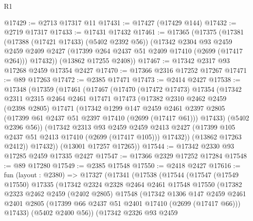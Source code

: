 \begin{lexlean}{R1}
\begin{coremodule}
@17429 := @2713 @17317 @11
@17431 := @17427 (@17429 @144)
@17432 := @2719 @17317
@17433 := @17431 @17432
@17461 := @17365
    (@17375
      (@17381
        (@17388 (@17421 @17433) (@5402 @2392 @56))
        (@17342
          @2304
          @93
          @2459
          @2459
          @2409
          @2427
          (@17399 @264 @2437 @51 @2409 @17410 (@2699 (@17417 @264)))
          @17432))
      (@13862 @17255 @2408))
@17467 := @17342 @2317 @93 @17268 @2459 @17354 @2427
@17470 := @17366 @2316 @17252 @17267
@17471 := @89 @17263
@17472 := @2385 @17471
@17473 := @2414 @2427
@17538 := @17348
    (@17359
      (@17461
        (@17467
          (@17470
            (@17472 @17473)
            @17354
            (@17342
              @2311
              @2315
              @2464
              @2461
              @17471
              @17473
              (@17382
                @2310
                @2462
                @2459
                (@2398 @2805)
                @17471
                (@17342
                  @1299
                  @147
                  @2459
                  @2461
                  @2397
                  @2805
                  (@17399 @61 @2437 @51 @2397 @17410 (@2699 (@17417 @61)))
                  @17433)
                (@5402 @2396 @56))
              (@17342
                @2313
                @93
                @2459
                @2459
                @2413
                @2427
                (@17399 @105 @2437 @51 @2413 @17410 (@2699 (@17417 @105)))
                @17432))
            (@13862 @17263 @2412))
          @17432))
      (@13001 @17257 @17265))
@17544 := @17342 @2330 @93 @17285 @2459 @17335 @2427
@17547 := @17366 @2329 @17252 @17284
@17548 := @89 @17280
@17549 := @2385 @17548
@17550 := @2418 @2427
@17616 := fun (layout : @2380) =>
  @17327
    (@17341
      (@17538
        (@17544
          (@17547
            (@17549 @17550)
            @17335
            (@17342
              @2324
              @2328
              @2464
              @2461
              @17548
              @17550
              (@17382
                @2323
                @2462
                @2459
                (@2402 @2805)
                @17548
                (@17342
                  @1306
                  @147
                  @2459
                  @2461
                  @2401
                  @2805
                  (@17399 @66 @2437 @51 @2401 @17410 (@2699 (@17417 @66)))
                  @17433)
                (@5402 @2400 @56))
              (@17342
                @2326
                @93
                @2459

\end{coremodule}
\end{lexlean}
